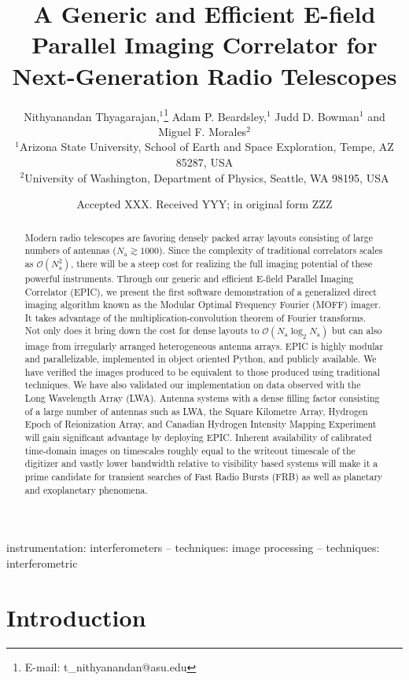 \documentclass[a4paper,fleqn,usenatbib]{mnras}
\title[E-field Parallel Imaging Correlator]{A Generic and Efficient E-field Parallel Imaging Correlator for Next-Generation Radio Telescopes}
\author[Thyagarajan et al.]{
Nithyanandan Thyagarajan,$^{1}$\thanks{E-mail: t\_nithyanandan@asu.edu}
Adam P. Beardsley,$^{1}$
Judd D. Bowman$^{1}$
\newauthor
and Miguel F. Morales$^{2}$
\\
$^{1}$Arizona State University, School of Earth and Space Exploration, Tempe, AZ 85287, USA\\
$^{2}$University of Washington, Department of Physics, Seattle, WA 98195, USA\\
}
\date{Accepted XXX. Received YYY; in original form ZZZ}
\newcommand{\Nant}{N_\textrm{a}}
\begin{document}
\label{firstpage}
\pagerange{\pageref{firstpage}--\pageref{lastpage}}
\maketitle

\begin{abstract}
Modern radio telescopes are favoring densely packed array layouts consisting of 
large numbers of antennas ($\Nant\gtrsim 1000$). Since the complexity of 
traditional correlators scales as $\mathcal{O}(\Nant^2)$, there will be a steep 
cost for realizing the full imaging potential of these powerful instruments. 
Through our generic and efficient E-field Parallel Imaging Correlator (EPIC), 
we present the first software demonstration of a generalized direct imaging 
algorithm known as the Modular Optimal Frequency Fourier (MOFF) imager. It takes 
advantage of the multiplication-convolution theorem of Fourier transforms. Not 
only does it bring down the cost for dense layouts to 
$\mathcal{O}(\Nant\log_2\Nant)$ but can also image from irregularly arranged 
heterogeneous antenna arrays. EPIC is highly modular and parallelizable, 
implemented in object oriented Python, and publicly available. We have verified 
the images produced to be equivalent to those produced using traditional 
techniques. We have also validated our implementation on data observed with the 
Long Wavelength Array (LWA). Antenna systems with a dense filling factor 
consisting of a large number of antennas such as LWA, the Square Kilometre Array, 
Hydrogen Epoch of Reionization Array, and Canadian Hydrogen Intensity Mapping 
Experiment will gain significant advantage by deploying EPIC. Inherent 
availability of calibrated time-domain images on timescales roughly equal to the 
writeout timescale of the digitizer and vastly lower bandwidth relative to 
visibility based systems will make it a prime candidate for transient searches 
of Fast Radio Bursts (FRB) as well as planetary and exoplanetary phenomena. 
\end{abstract}

\begin{keywords}
instrumentation: interferometers -- techniques: image processing -- techniques: interferometric
\end{keywords}


\section{Introduction}
\end{document}
